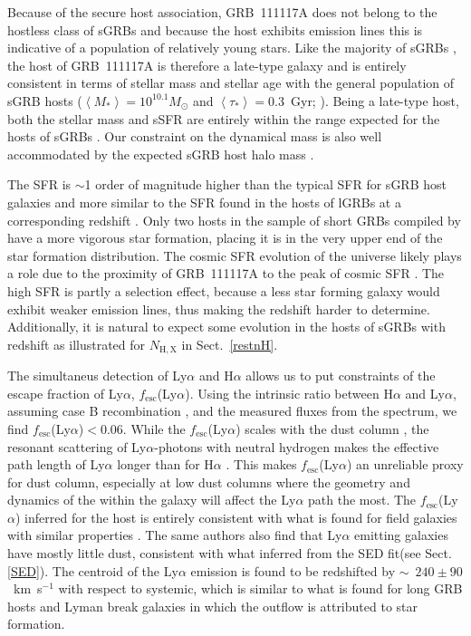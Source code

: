 \documentclass[referee]{aa}
\newcommand{\lya}{Ly$\alpha$}
\newcommand{\ha}{H$\alpha$}
\newcommand{\hi}{\ion{H}{i}}
\begin{document}
Because of the secure host association, GRB~111117A does not belong to the
hostless class of sGRBs \citep{Berger2010a} and because the host exhibits
emission lines this is indicative of a population of relatively young stars.
Like the majority of sGRBs \citep{Fong2013b}, the host of GRB~111117A is
therefore a late-type galaxy and is entirely consistent in terms of stellar mass
and stellar age with the general population of sGRB hosts ($\left\langle M _*
\right\rangle = 10^{10.1} M_{\odot}$ and $\left\langle \tau _* \right\rangle =
0.3 $~Gyr; \citealt{Leibler2010}). Being a late-type host, both the stellar mass
and sSFR are entirely within the range expected for the hosts of sGRBs
\citep{Behroozi2014}. Our constraint on the dynamical mass is also well
accommodated by the expected sGRB host halo mass \citep{Behroozi2014}.

The SFR is $\sim$1 order of magnitude higher than the typical SFR for sGRB host
galaxies \citep{Berger2014} and more similar to the SFR found in the hosts of
lGRBs at a corresponding redshift \citep{Kruhler2015}. Only two hosts in the
sample of short GRBs compiled by \citet{Berger2014} have a more vigorous star
formation, placing it is in the very upper end of the star formation
distribution. The cosmic SFR evolution of the universe likely plays a role due
to the proximity of GRB~111117A to the peak of cosmic SFR \citep{Madau2014}.
The high SFR is partly a selection effect, because a less star forming galaxy
would exhibit weaker emission lines, thus making the redshift harder to
determine. Additionally, it is natural to expect some evolution in the hosts of
sGRBs with redshift as illustrated for $N_\mathrm{H,X}$ in Sect.~\ref{restnH}.

The simultaneus detection of \lya{} and \ha{} allows us to put constraints of
the escape fraction of \lya{}, $f_{\mathrm{esc}}$(\lya). Using the intrinsic
ratio between \ha{} and \lya{}, assuming case B recombination
\citep{Brocklehurst1971}, and the measured fluxes from the spectrum, we find
$f_{\mathrm{esc}}$(\lya)$ < 0.06$. While the $f_{\mathrm{esc}}$(\lya) scales
with the dust column \citep{Hayes2011}, the resonant scattering of
\lya{}-photons with neutral hydrogen makes the effective path length of \lya{}
longer than for \ha{} \citep{Atek2009}. This makes $f_{\mathrm{esc}}$(\lya) an
unreliable proxy for dust column, especially at low dust columns
\citep{Atek2014} where the geometry and dynamics of the \hi{} within the galaxy
will affect the \lya{} path the most. The $f_{\mathrm{esc}}$(\lya) inferred for
the host is entirely consistent with what is found for field galaxies with
similar properties \citep{Oyarzun2017}. The same authors also find that \lya{}
emitting galaxies have mostly little dust, consistent with what inferred from
the SED fit(see Sect. \ref{SED}). The centroid of the Ly$\alpha$ emission is
found to be redshifted by $\sim$~$240\pm 90$~km~s$^{-1}$ with respect to
systemic, which is similar to what is found for long GRB hosts
\citep{Milvang-Jensen2012a} and Lyman break galaxies \citep{Shapley2003a} in
which the outflow is attributed to star formation.
\end{document}
